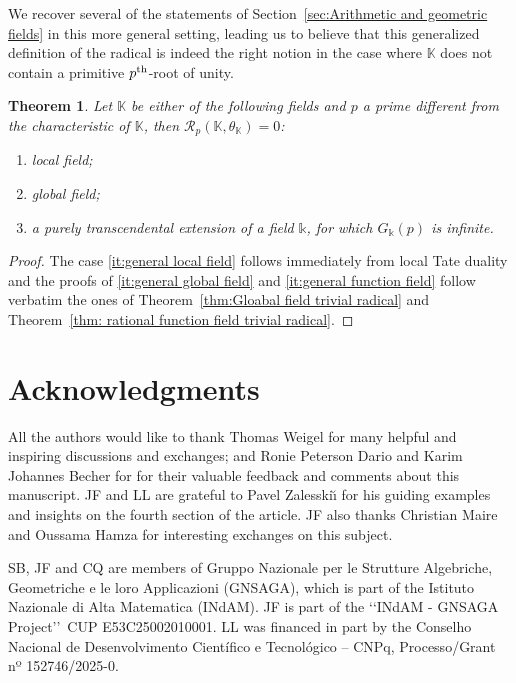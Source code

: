\documentclass{amsart}
\newtheorem{thm}{Theorem}[section]
\theoremstyle{definition}
\theoremstyle{remark}
\newcommand{\KK}{\mathbb{K}}
\newcommand{\calR}{\mathcal{R}}
\newcommand{\pth}{{p^{\rm th}}}
\begin{document}
We recover several of the statements of Section~\ref{sec:Arithmetic and geometric fields} in this more general setting, leading us to believe that this generalized definition of the radical is indeed the right notion in the case where $\KK$ does not contain a primitive $\pth$-root of unity.
\begin{thm}
\label{thm:general fields}
    Let $\KK$ be either of the following fields and $p$ a prime different from the characteristic of $\KK$, then $\calR_p(\KK,\theta_{\KK})=0$:
    \begin{enumerate}[label=(\roman*)]
        \item \label{it:general local field} local field;
        \item \label{it:general global field} global field;
        \item \label{it:general function field} a purely transcendental extension of a field $\mathbb{k}$, for which $G_{\mathbb{k}}(p)$ is infinite.
    \end{enumerate}
\end{thm}
\begin{proof}
    The case \ref{it:general local field} follows immediately from local Tate duality and the proofs of \ref{it:general global field} and \ref{it:general function field} follow verbatim the ones of Theorem~\ref{thm:Gloabal field trivial radical} and Theorem~\ref{thm: rational function field trivial radical}.
\end{proof}


\section*{Acknowledgments}
    All the authors would like to thank Thomas Weigel for many helpful and inspiring discussions and exchanges; and Ronie Peterson Dario and Karim Johannes Becher for for their valuable feedback and comments about this manuscript.
    JF and LL are grateful to Pavel Zalesski{\u{\i}} for his guiding examples and insights on the fourth section of the article. JF also thanks Christian Maire and Oussama Hamza for interesting exchanges on this subject.

    SB, JF and CQ are members of Gruppo Nazionale per le Strutture Algebriche, Geometriche e le loro Applicazioni (GNSAGA), which is part of the Istituto Nazionale di Alta Matematica (INdAM).
    JF is part of the \lq\lq INdAM - GNSAGA Project\rq\rq\ CUP E53C25002010001. LL was financed in part by the Conselho Nacional de Desenvolvimento Científico e Tecnológico – CNPq, Processo/Grant nº 152746/2025-0.

\newpage
%
\end{document}
